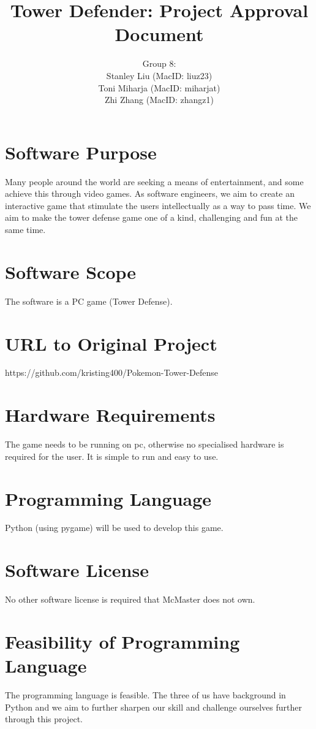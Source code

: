 \documentclass[12pt]{article}
\title{Tower Defender: Project Approval Document}
\author{Group 8: \\
                 Stanley Liu (MacID: liuz23) \\    
                 Toni Miharja (MacID: miharjat)\\
                 Zhi Zhang (MacID: zhangz1)}
\begin{document}
\maketitle

\section{Software Purpose}
Many people around the world are seeking a means of entertainment, and some achieve this through video games. As software engineers, we aim to create an interactive game that stimulate the users intellectually as a way to pass time. We aim to make the tower defense game one of a kind, challenging and fun at the same time.

\section{Software Scope}
The software is a PC game (Tower Defense).

\section{URL to Original Project}
https://github.com/kristing400/Pokemon-Tower-Defense

\section{Hardware Requirements}
The game needs to be running on pc, otherwise no specialised hardware is required for the user. It is simple to run and easy to use.

\section{Programming Language}
Python (using pygame) will be used to develop this game.

\section{Software License}
No other software license is required that McMaster does not own.

\section{Feasibility of Programming Language}
The programming language is feasible. The three of us have background in Python and we aim to further sharpen our skill and challenge ourselves further through this project.
\end{document}
